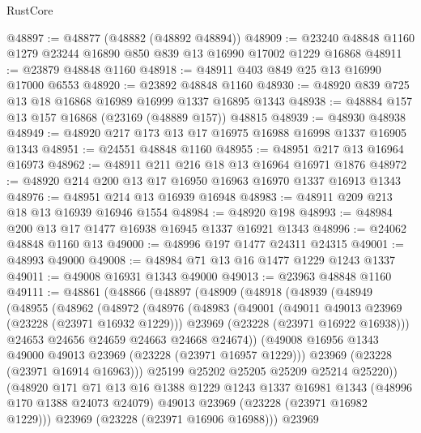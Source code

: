 \begin{lexlean}{RustCore}
\begin{coremodule}
@48897 := @48877 (@48882 (@48892 @48894))
@48909 := @23240 @48848 @1160 @1279 @23244 @16890 @850 @839 @13 @16990 @17002 @1229 @16868
@48911 := @23879 @48848 @1160
@48918 := @48911 @403 @849 @25 @13 @16990 @17000 @6553
@48920 := @23892 @48848 @1160
@48930 := @48920 @839 @725 @13 @18 @16868 @16989 @16999 @1337 @16895 @1343
@48938 := @48884 @157 @13 @157 @16868 (@23169 (@48889 @157)) @48815
@48939 := @48930 @48938
@48949 := @48920 @217 @173 @13 @17 @16975 @16988 @16998 @1337 @16905 @1343
@48951 := @24551 @48848 @1160
@48955 := @48951 @217 @13 @16964 @16973
@48962 := @48911 @211 @216 @18 @13 @16964 @16971 @1876
@48972 := @48920 @214 @200 @13 @17 @16950 @16963 @16970 @1337 @16913 @1343
@48976 := @48951 @214 @13 @16939 @16948
@48983 := @48911 @209 @213 @18 @13 @16939 @16946 @1554
@48984 := @48920 @198
@48993 := @48984 @200 @13 @17 @1477 @16938 @16945 @1337 @16921 @1343
@48996 := @24062 @48848 @1160 @13
@49000 := @48996 @197 @1477 @24311 @24315
@49001 := @48993 @49000
@49008 := @48984 @71 @13 @16 @1477 @1229 @1243 @1337
@49011 := @49008 @16931 @1343 @49000
@49013 := @23963 @48848 @1160
@49111 := @48861
    (@48866
      (@48897
        (@48909
          (@48918
            (@48939
              (@48949
                (@48955
                  (@48962
                    (@48972
                      (@48976
                        (@48983
                          (@49001
                            (@49011 @49013 @23969 (@23228 (@23971 @16932 @1229)))
                            @23969
                            (@23228 (@23971 @16922 @16938)))
                          @24653
                          @24656
                          @24659
                          @24663
                          @24668
                          @24674))
                      (@49008 @16956 @1343 @49000 @49013 @23969 (@23228 (@23971 @16957 @1229)))
                      @23969
                      (@23228 (@23971 @16914 @16963)))
                    @25199
                    @25202
                    @25205
                    @25209
                    @25214
                    @25220))
                (@48920
                  @171
                  @71
                  @13
                  @16
                  @1388
                  @1229
                  @1243
                  @1337
                  @16981
                  @1343
                  (@48996 @170 @1388 @24073 @24079)
                  @49013
                  @23969
                  (@23228 (@23971 @16982 @1229)))
                @23969
                (@23228 (@23971 @16906 @16988)))
              @23969

\end{coremodule}
\end{lexlean}
